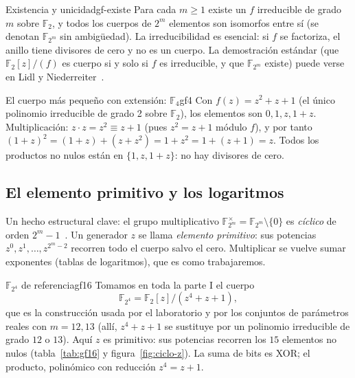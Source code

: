 \documentclass[11pt,a4paper,oneside]{report}
\newcommand{\F}{\mathbb{F}}
\newcommand{\GF}[1]{\mathbb{F}_{#1}}
\newcommand{\FF}[1]{\F_{2^{#1}}}
\begin{document}
\begin{observacion}{Existencia y unicidad}{gf-existe}
Para cada $m\ge 1$ existe un $f$ irreducible de grado $m$ sobre $\F_2$, y
todos los cuerpos de $2^m$ elementos son isomorfos entre sí (se denotan
$\GF{2^m}$ sin ambigüedad). La irreducibilidad es esencial: si $f$ se
factoriza, el anillo tiene divisores de cero y no es un cuerpo. La
demostración estándar (que $\F_2[z]/(f)$ es cuerpo si y solo si $f$ es
irreducible, y que $\GF{2^m}$ existe) puede verse en Lidl y
Niederreiter~\cite{lidl}.
\end{observacion}

\begin{ejemplo}{El cuerpo más pequeño con extensión: $\GF{4}$}{gf4}
Con $f(z)=z^2+z+1$ (el único polinomio irreducible de grado 2 sobre
$\F_2$), los elementos son $0,1,z,1+z$. Multiplicación:
$z\cdot z=z^2\equiv z+1$ (pues $z^2=z+1$ módulo $f$), y por tanto
$(1+z)^2=(1+z)+(z+z^2)=1+z^2=1+(z+1)=z$. Todos los productos no nulos
están en $\{1,z,1+z\}$: no hay divisores de cero.
\end{ejemplo}

\subsection*{El elemento primitivo y los logaritmos}

Un hecho estructural clave: el grupo multiplicativo
$\GF{2^m}^\times=\GF{2^m}\setminus\{0\}$ es \emph{cíclico} de orden
$2^m-1$~\cite{lidl}. Un generador $z$ se llama \emph{elemento primitivo}:
sus potencias $z^0,z^1,\dots,z^{2^m-2}$ recorren todo el cuerpo salvo el
cero. Multiplicar se vuelve sumar exponentes (tablas de logaritmos), que es
como trabajaremos.

\begin{ejemplo}{$\FF4$ de referencia}{gf16}
Tomamos en toda la parte I el cuerpo
\[
\FF4=\F_2[z]/(z^4+z+1),
\]
que es la construcción usada por el laboratorio y por los conjuntos de
parámetros reales con $m=12,13$ (allí, $z^4+z+1$ se sustituye por un
polinomio irreducible de grado $12$ o $13$). Aquí $z$ es primitivo: sus
potencias recorren los $15$ elementos no nulos (tabla~\ref{tab:gf16} y
figura~\ref{fig:ciclo-z}). La suma de bits es XOR; el producto, polinómico
con reducción $z^4=z+1$.
\end{ejemplo}
\end{document}
